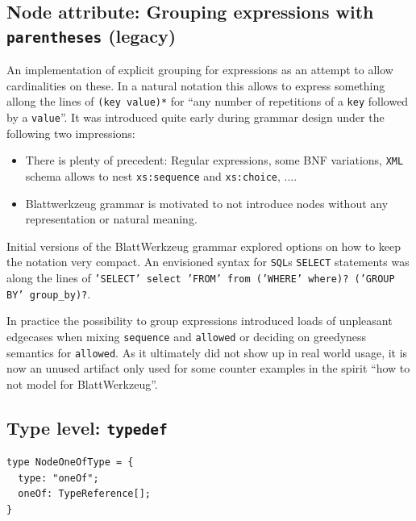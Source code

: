 \documentclass[]{report}
\begin{document}
\subsection{Node attribute: Grouping expressions with \texttt{parentheses} (legacy)}
\label{sec:grammar-spec-parentheses}

An implementation of explicit grouping for expressions as an attempt to allow cardinalities on these. In a natural notation this allows to express something allong the lines of \texttt{(key value)*} for \enquote{any number of repetitions of a \texttt{key} followed by a \texttt{value}}. It was introduced quite early during grammar design under the following two impressions:

\begin{itemize}
\item There is plenty of precedent: Regular expressions, some BNF variations, \texttt{XML} schema allows to nest \texttt{xs:sequence} and \texttt{xs:choice}, ....
\item Blattwerkzeug grammar is motivated to not introduce nodes without any representation or natural meaning.
\end{itemize}

Initial versions of the Blatt\-Werkzeug grammar explored options on how to keep the notation very compact. An envisioned syntax for \texttt{SQL}s \texttt{SELECT} statements was along the lines of \texttt{'SELECT' select 'FROM' from ('WHERE' where)? ('GROUP BY' group\_by)?}.

In practice the possibility to group expressions introduced loads of unpleasant edgecases when mixing \texttt{sequence} and \texttt{allowed} or deciding on greedyness semantics for \texttt{allowed}. As it ultimately did not show up in real world usage, it is now an unused artifact only used for some counter examples in the spirit \enquote{how to not model for Blatt\-Werkzeug}.

\subsection{Type level: \texttt{typedef}}
\label{sec:grammar-typedef}

\begin{listing}[H]
\begin{verbatim}
type NodeOneOfType = {
  type: "oneOf";
  oneOf: TypeReference[];
}
\end{verbatim}
\caption{Type definition of \texttt{choice} child specification}
\label{lst:grammar-children-description}
\end{listing}
\end{document}
